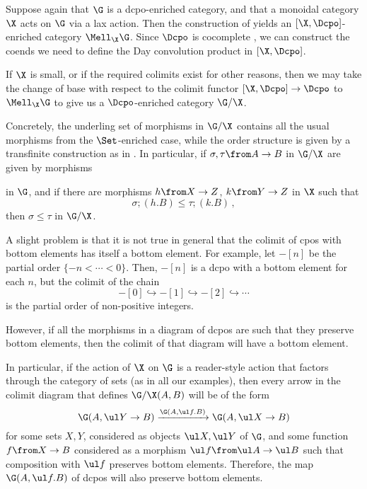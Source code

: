 Suppose again that $\G$ is a dcpo-enriched category, and that a monoidal category $\X$ acts on $\G$ via a lax action.  
Then the construction of \Mellies yields an $[\X,\Dcpo]$-enriched category $\Mell_\X\G$.
Since $\Dcpo$ is cocomplete \cite{CocompleteDcpo}, we can construct the coends we need to define the Day convolution product in $[\X,\Dcpo]$.

If $\X$ is small, or if the required colimits exist for other reasons, then we may take the change of base with respect to the colimit functor $[\X,\Dcpo] \to \Dcpo$ to $\Mell_\X\G$ to give us a $\Dcpo$-enriched category $\G/\X$.

Concretely, the underling set of morphisms in $\G/\X$ contains all the usual morphisms from the $\Set$-enriched case, while the order structure is given by a transfinite construction as in \cite[2.17]{Fiech}.  
In particular, if $\sigma,\tau\from A \to B$ in $\G/\X$ are given by morphisms
in $\G$, and if there are morphisms $h\from X \to Z$, $k\from Y \to Z$ in $\X$ such that
\[
  \sigma;(h.B)\le\tau;(k.B)\,,
  \]
then $\sigma\le\tau$ in $\G/\X$.

A slight problem is that it is not true in general that the colimit of cpos with bottom elements has itself a bottom element.  
For example, let $-[n]$ be the partial order $\{-n<\cdots<0\}$.  
Then, $-[n]$ is a dcpo with a bottom element for each $n$, but the colimit of the chain
\[
  -[0] \hookrightarrow -[1] \hookrightarrow -[2] \hookrightarrow \cdots
  \]
is the partial order of non-positive integers.

However, if all the morphisms in a diagram of dcpos are such that they preserve bottom elements, then the colimit of that diagram will have a bottom element.

In particular, if the action of $\X$ on $\G$ is a reader-style action that factors through the category of sets (as in all our examples), then every arrow in the colimit diagram that defines $\G/\X(A,B)$ will be of the form
\[
  \G(A, \ul Y \to B) \xrightarrow{\G(A,\ul f.B)} \G(A, \ul X \to B)
  \]
for some sets $X,Y$, considered as objects $\ul X,\ul Y$ of $\G$, and some function $f \from X \to B$ considered as a morphism $\ul f \from \ul A \to \ul B$ such that composition with $\ul f$ preserves bottom elements.
Therefore, the map $\G(A,\ul f.B)$ of dcpos will also preserve bottom elements.

